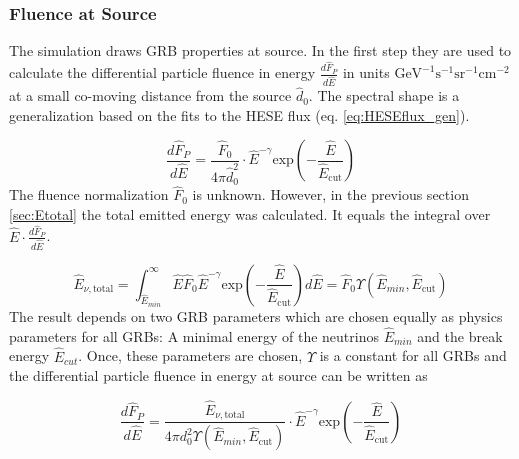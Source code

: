 \subsubsection{Fluence at Source}
The simulation draws GRB properties at source. In the first step they are used
to calculate the differential particle fluence in energy
$\frac{d\hat{F}_P}{d\hat{E}}$ in units $\text{GeV}^{-1}
\text{s}^{-1}\text{sr}^{-1} \text{cm}^{-2}$ at a small co-moving distance from
the source $\hat{d}_0$. The spectral shape is a generalization based on the fits
to the HESE flux (eq. \ref{eq:HESEflux_gen}).

\begin{equation}
 \frac{d\hat{F}_P}{d\hat{E}} = \frac{\hat{F}_0}{4 \pi \hat{d}_0^2} \cdot
\hat{E}^{-\gamma} \text{exp} \left( - \frac{\hat{E}}{\hat{E}_\text{cut}} \right)
\end{equation}
The fluence normalization $\hat{F}_0$ is unknown. However, in the previous
section \ref{sec:Etotal} the total emitted energy was calculated. It equals the
integral over $\hat{E} \cdot \frac{d\hat{F}_P}{d\hat{E}}$.

\begin{equation}
\label{eq:Etotal}
 \hat{E}_{\nu, \text{total}} = \int_{\hat{E}_{min}}^\infty \hat{E} \hat{F}_0
\hat{E}^{-\gamma} \text{exp} \left(  -
\frac{\hat{E}}{\hat{E}_\text{cut}}\right) d\hat{E} = \hat{F}_0
\Upsilon \left(\hat{E}_{min}, \hat{E}_\text{cut}\right)
\end{equation}
The result depends on two GRB parameters which are chosen equally as physics 
parameters
for all GRBs: A minimal energy of the neutrinos $\hat{E}_{min}$ and the
break energy $\hat{E}_{cut}$. Once, these parameters are chosen, $\Upsilon$ is
a constant for all GRBs and the differential particle fluence in energy at
source can be written as

\begin{equation}
 \frac{d\hat{F}_P}{d\hat{E}} = \frac{\hat{E}_{\nu, \text{total}}}{4 \pi
d_0^2\Upsilon\left(\hat{E}_{min}, \hat{E}_\text{cut}\right)} \cdot
\hat{E}^{-\gamma}
\text{exp} \left( - \frac{\hat{E}}{\hat{E}_\text{cut}} \right)
\label{eq:partFluenceS}
\end{equation}

